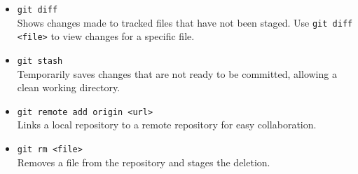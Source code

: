 \documentclass[12pt]{article}
\begin{document}
\begin{itemize}
    \item[] \texttt{git diff} \\Shows changes made to tracked files that have not been staged. Use \texttt{git diff <file>} to view changes for a specific file.

    \item[] \texttt{git stash} \\Temporarily saves changes that are not ready to be committed, allowing a clean working directory.

    \item[] \texttt{git remote add origin <url>} \\Links a local repository to a remote repository for easy collaboration.

    \item[] \texttt{git rm <file>} \\Removes a file from the repository and stages the deletion.
\end{itemize}


% 
% 
\end{document}
